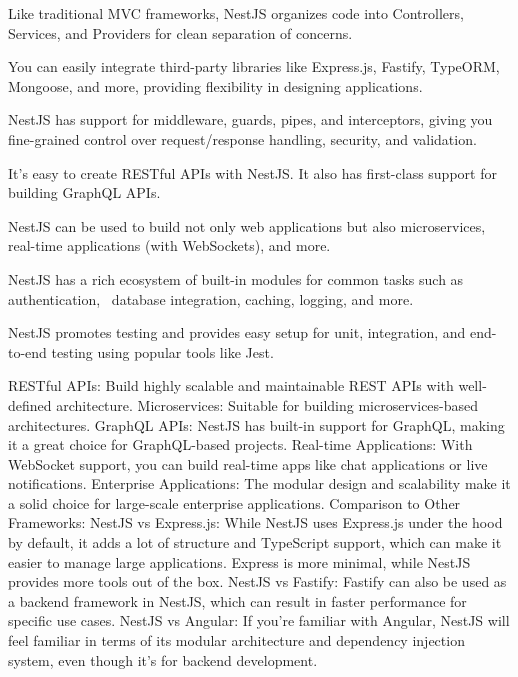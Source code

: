 
Like traditional MVC frameworks, NestJS organizes code into Controllers, Services, and Providers for clean separation of concerns.


You can easily integrate third-party libraries like Express.js, Fastify, TypeORM, Mongoose, and more, 
providing flexibility in designing applications.

NestJS has support for middleware, guards, pipes, and interceptors, 
giving you fine-grained control over request/response handling, security, and validation.


It’s easy to create RESTful APIs with NestJS. 
It also has first-class support for building GraphQL APIs.


NestJS can be used to build not only web applications but also microservices, 
real-time applications (with WebSockets), and more.


NestJS has a rich ecosystem of built-in modules for common tasks such as authentication, \
database integration, caching, logging, and more.


NestJS promotes testing and provides easy setup for unit, integration, 
and end-to-end testing using popular tools like Jest.


RESTful APIs:       Build highly scalable and maintainable REST APIs with well-defined architecture.
Microservices:      Suitable for building microservices-based architectures.
GraphQL APIs:       NestJS has built-in support for GraphQL, making it a great choice for GraphQL-based projects.
Real-time Applications:    With WebSocket support, you can build real-time apps like chat applications or live notifications.
Enterprise Applications:   The modular design and scalability make it a solid choice for large-scale enterprise applications.
Comparison to Other Frameworks:    NestJS vs Express.js: While NestJS uses Express.js under the hood by default, it adds a lot of structure and TypeScript support, 
                                   which can make it easier to manage large applications. Express is more minimal, while NestJS provides more tools out of the box.
NestJS vs Fastify:   Fastify can also be used as a backend framework in NestJS, which can result in faster performance for specific use cases.
NestJS vs Angular:   If you're familiar with Angular, NestJS will feel familiar in terms of its modular architecture and dependency injection system, 
                     even though it's for backend development.

